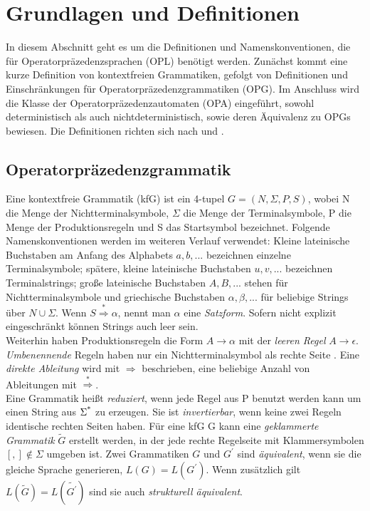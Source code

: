 \section{Grundlagen und Definitionen}
In diesem Abschnitt geht es um die Definitionen und Namenskonventionen, die für Operatorpräzedenzsprachen (OPL) benötigt werden. Zunächst kommt eine kurze Definition von kontextfreien Grammatiken, gefolgt von Definitionen und Einschränkungen für Operatorpräzedenzgrammatiken (OPG). Im Anschluss wird die Klasse der Operatorpräzedenzautomaten (OPA) eingeführt, sowohl deterministisch als auch nichtdeterministisch, sowie deren Äquivalenz zu OPGs bewiesen. Die Definitionen richten sich nach \cite{precedence_automata} \cite{mso} und \cite{op_vpl_property}.
\subsection{Operatorpräzedenzgrammatik}
Eine kontextfreie Grammatik (kfG) ist ein 4-tupel $G = (N, \Sigma, P, S)$, wobei N die Menge der Nichtterminalsymbole, $\Sigma$ die Menge der Terminalsymbole, P die Menge der Produktionsregeln und S das Startsymbol bezeichnet. Folgende Namenskonventionen werden im weiteren Verlauf verwendet: Kleine lateinische Buchstaben am Anfang des Alphabets $a, b, ...$ bezeichnen einzelne Terminalsymbole; spätere, kleine lateinische Buchstaben $u,v, ...$ bezeichnen Terminalstrings; große lateinische Buchstaben $A, B, ...$ stehen für Nichtterminalsymbole und griechische Buchstaben $\alpha, \beta, ...$ für beliebige Strings über $N \cup \Sigma$. Wenn $S \overset{*}{\Rightarrow} \alpha$, nennt man $\alpha$ eine \textit{Satzform}. Sofern nicht explizit eingeschränkt können Strings auch leer sein.\\
Weiterhin haben Produktionsregeln die Form $A \rightarrow \alpha$ mit der \textit{leeren Regel} $A \rightarrow \epsilon$. \textit{Umbenennende} Regeln haben nur ein Nichtterminalsymbol als rechte Seite . Eine \textit{direkte Ableitung} wird mit $\Rightarrow$ beschrieben, eine beliebige Anzahl von Ableitungen mit $\overset{*}{\Rightarrow}$. 
\\
Eine Grammatik heißt \textit{reduziert}, wenn jede Regel aus P benutzt werden kann um einen String aus $\Sigma\textsuperscript{*}$ zu erzeugen. Sie ist \textit{invertierbar}, wenn keine zwei Regeln identische rechten Seiten haben. Für eine kfG G kann eine \textit{geklammerte Grammatik} $\tilde{G}$ erstellt werden, in der jede rechte Regelseite mit Klammersymbolen $[,] \notin \Sigma$ umgeben ist. Zwei Grammatiken $G$ und $G^\prime$ sind \textit{äquivalent}, wenn sie die gleiche Sprache generieren, $L(G)=L(G^\prime)$. Wenn zusätzlich gilt $L(\tilde{G})=L(\tilde{G^\prime})$ sind sie auch \textit{strukturell äquivalent}.\\

